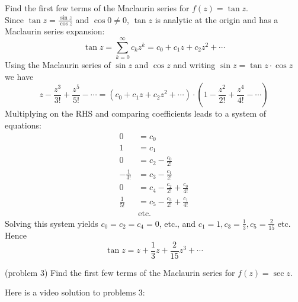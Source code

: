 \documentclass[handout]{ximera}
\begin{document}
\begin{example}[example 3]
Find the first few terms of the Maclaurin series for $f(z) = \tan z$.\\
Since $\tan z = \frac{\sin z}{\cos z}$ and $\cos 0 \neq 0$, $\tan z$ is analytic at the origin 
and has a Maclaurin series expansion:
\[
\tan z = \sum_{k=0}^\infty c_k z^k = c_0 + c_1 z + c_2 z^2 + \cdots
\]
Using the Maclaurin series of $\sin z$ and $\cos z$ and writing $\sin z = \tan z \cdot \cos z$ we have
\[
z-\frac{z^3}{3!} + \frac{z^5}{5!} - \cdots = \left(c_0 + c_1 z + c_2 z^2 + \cdots\right) \cdot \left(1-\frac{z^2}{2!} + \frac{z^4}{4!} - \cdots \right)
\]
Multiplying on the RHS and comparing coefficients leads to a system of equations:
\begin{align*}
0 & = c_0 \\
1 & = c_1 \\
0 & = c_2 -\frac{c_0}{2!} \\
-\frac{1}{3!} & =  c_3- \frac{c_1}{2!} \\
0 & = c_4 - \frac{c_2}{2!} +  \frac{c_0}{4!} \\
 \frac{1}{5!} & = c_5- \frac{c_3}{2!} +  \frac{c_1}{4!}\\
 & \text{etc.}
\end{align*}
Solving this system yields $c_0 = c_2 = c_4 = 0$, etc., and  $c_1 = 1, c_3 = \frac13, c_5 = \frac{2}{15}$ etc.
Hence 
\[
\tan z = z + \frac13 z + \frac{2}{15}z^3 + \cdots
\]
\end{example}

\begin{problem}(problem 3)
Find the first few terms of the Maclaurin series for $f(z) = \sec z$.
\end{problem}

Here is a video solution  to problems 3:\\
\begin{foldable}
\end{foldable}
\end{document}

